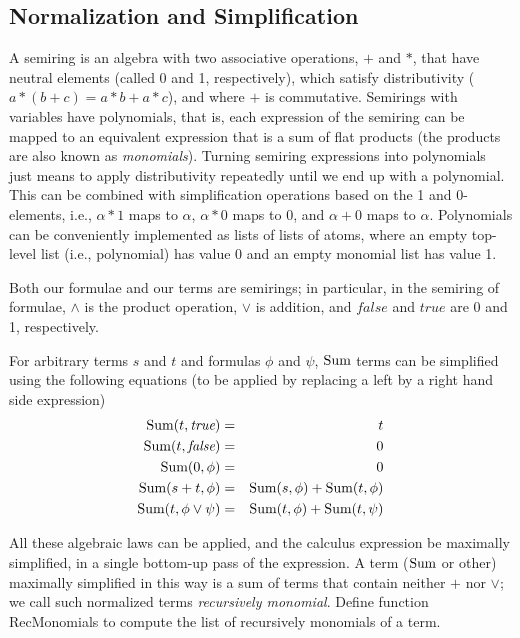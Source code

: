 \subsection{Normalization and Simplification}


A semiring is an algebra with two associative operations,
$+$ and $*$, that
have neutral elements (called 0 and 1, respectively), which satisfy
distributivity ($a*(b+c)= a*b + a*c$), and where $+$ is commutative.
Semirings with variables
have polynomials, that is, each expression of the
semiring can be mapped to an equivalent expression that is
a sum of flat products (the products are also known as {\em monomials}\/).
Turning semiring expressions into polynomials just means to apply
distributivity repeatedly until we end up with a polynomial.
This can be combined with simplification operations based on the 1 and
0-elements, i.e., $\alpha * 1$ maps to $\alpha$, $\alpha*0$ maps to $0$, and
$\alpha+0$ maps to $\alpha$. Polynomials can be conveniently implemented
as lists of lists of atoms, where an empty top-level list (i.e., polynomial)
has value 0 and an empty monomial list has value 1.

Both our formulae and our terms are semirings; in particular,
in the semiring of formulae, $\land$ is the product operation,
$\lor$ is addition,
and $\textit{false}$ and $\textit{true}$ are 0 and 1, respectively.

For arbitrary terms $s$ and $t$ and formulas $\phi$ and $\psi$,
$\mbox{Sum}$ terms can be simplified using the following equations (to be
applied by replacing a left by a right hand side expression)
\begin{eqnarray*}
\mbox{Sum}(t, \textit{true}) &=& t \\
\mbox{Sum}(t, \textit{false}) &=& 0 \\
\mbox{Sum}(0, \phi) &=& 0 \\
\mbox{Sum}(s+t, \phi) &=& \mbox{Sum}(s, \phi) + \mbox{Sum}(t, \phi) \\
\mbox{Sum}(t, \phi \lor \psi) &=& \mbox{Sum}(t, \phi) + \mbox{Sum}(t, \psi)
\end{eqnarray*}

All these algebraic laws can be applied, and the calculus expression
be maximally simplified, in a single bottom-up pass of the expression.
A term ($\mbox{Sum}$ or other) maximally simplified in this way
is a sum of terms that contain neither $+$ nor $\lor$; we call such 
normalized terms {\em recursively monomial}.
Define function RecMonomials to compute the list of recursively monomials
of a term.

